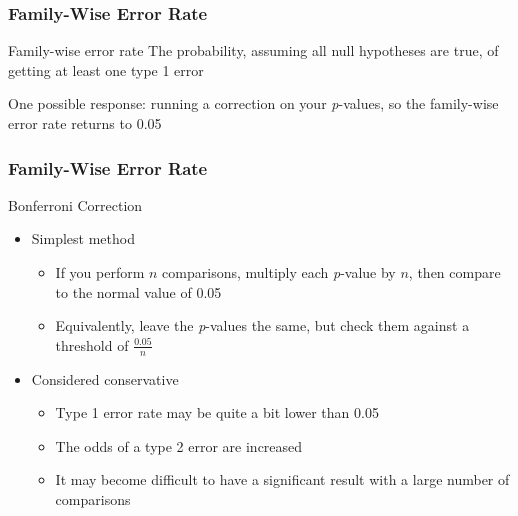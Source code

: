 \documentclass[10pt, block=fill]{beamer}
\begin{document}
\begin{frame}
  \frametitle{Family-Wise Error Rate}

  \begin{block}{Family-wise error rate}
    The probability, assuming all null hypotheses are true, of getting at least one type 1 error
  \end{block}
  
  One possible response: running a correction on your \textit{p}-values, so the family-wise error rate returns to 0.05
\end{frame}

\begin{frame}
  \frametitle{Family-Wise Error Rate}
    
  \begin{block}{Bonferroni Correction}
    \begin{itemize}
      \item Simplest method
      \begin{itemize}
        \item If you perform $n$ comparisons, multiply each \textit{p}-value by $n$, then compare to the normal value of 0.05
        \item Equivalently, leave the \textit{p}-values the same, but check them against a threshold of $\frac{0.05}{n}$
      \end{itemize}
      \item Considered conservative
      \begin{itemize}
        \item Type 1 error rate may be quite a bit lower than 0.05
        \item The odds of a type 2 error are increased
        \item It may become difficult to have a significant result with a large number of comparisons
      \end{itemize}
    \end{itemize}
  \end{block}
  
\end{frame}
\end{document}
